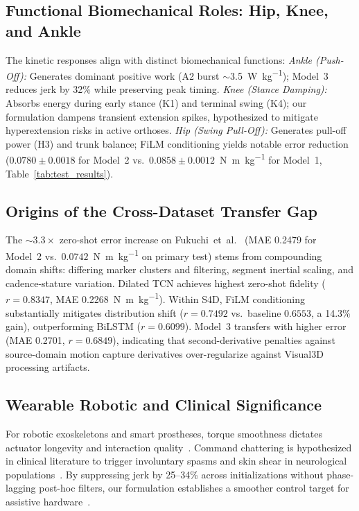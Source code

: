 \documentclass[journal]{IEEEtran}
\newcommand{\Nmskg}{\si{\newton\metre\per\kilogram}}
\newcommand{\Wkg}{\si{\watt\per\kilogram}}
\begin{document}
\subsection{Functional Biomechanical Roles: Hip, Knee, and Ankle}
The kinetic responses align with distinct biomechanical functions: \emph{Ankle (Push-Off):} Generates dominant positive work (A2 burst $\sim$3.5~\Wkg{}); Model~3 reduces jerk by 32\% while preserving peak timing. \emph{Knee (Stance Damping):} Absorbs energy during early stance (K1) and terminal swing (K4); our formulation dampens transient extension spikes, hypothesized to mitigate hyperextension risks in active orthoses. \emph{Hip (Swing Pull-Off):} Generates pull-off power (H3) and trunk balance; FiLM conditioning yields notable error reduction ($0.0780 \pm 0.0018$ for Model~2 vs.\ $0.0858 \pm 0.0012$~\Nmskg{} for Model~1, Table~\ref{tab:test_results}).

\subsection{Origins of the Cross-Dataset Transfer Gap}
The ${\sim}3.3\times$ zero-shot error increase on Fukuchi~et~al.~\cite{fukuchi2018public} (MAE 0.2479 for Model~2 vs.\ $0.0742$~\Nmskg{} on primary test) stems from compounding domain shifts: differing marker clusters and filtering, segment inertial scaling, and cadence-stature variation. Dilated TCN achieves highest zero-shot fidelity ($r = 0.8347$, MAE 0.2268~\Nmskg{}). Within S4D, FiLM conditioning substantially mitigates distribution shift ($r = 0.7492$ vs.\ baseline $0.6553$, a 14.3\% gain), outperforming BiLSTM ($r = 0.6099$). Model~3 transfers with higher error (MAE 0.2701, $r = 0.6849$), indicating that second-derivative penalties against source-domain motion capture derivatives over-regularize against Visual3D processing artifacts.

\subsection{Wearable Robotic and Clinical Significance}
For robotic exoskeletons and smart prostheses, torque smoothness dictates actuator longevity and interaction quality~\cite{baud2021review}. Command chattering is hypothesized in clinical literature to trigger involuntary spasms and skin shear in neurological populations~\cite{tucker2015control}. By suppressing jerk by 25--34\% across initializations without phase-lagging post-hoc filters, our formulation establishes a smoother control target for assistive hardware~\cite{ding2018human}.
\end{document}
